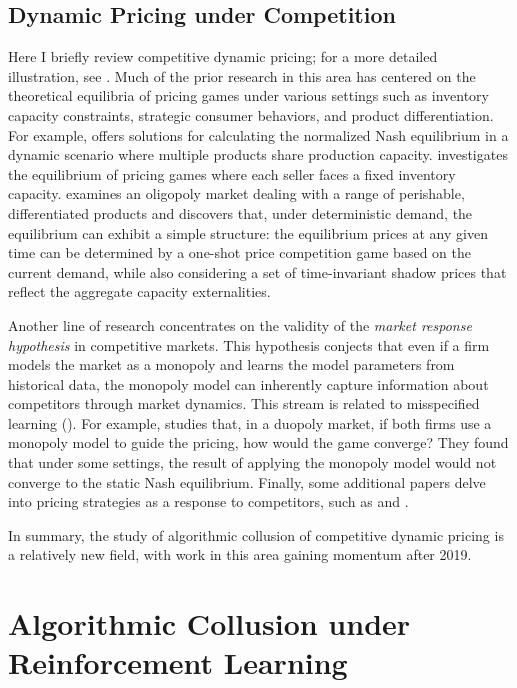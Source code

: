 \documentclass[mnsc,nonblindrev]{workingpaper}
\begin{document}
\subsection{Dynamic Pricing under Competition}
\label{subsec:competition}

Here I briefly review competitive dynamic pricing; for a more detailed illustration, see \cite{chen2015recent}. Much of the prior research in this area has centered on the theoretical equilibria of pricing games under various settings such as inventory capacity constraints, strategic consumer behaviors, and product differentiation. For example, \cite{adida2010dynamic} offers solutions for calculating the normalized Nash equilibrium in a dynamic scenario where multiple products share production capacity. \cite{martinez2011dynamic} investigates the equilibrium of pricing games where each seller faces a fixed inventory capacity. \cite{gallego2014dynamic} examines an oligopoly market dealing with a range of perishable, differentiated products and discovers that, under deterministic demand, the equilibrium can exhibit a simple structure: the equilibrium prices at any given time can be determined by a one-shot price competition game based on the current demand, while also considering a set of time-invariant shadow prices that reflect the aggregate capacity externalities.

Another line of research concentrates on the validity of the \textit{market response hypothesis} in competitive markets. This hypothesis conjects that even if a firm models the market as a monopoly and learns the model parameters from historical data, the monopoly model can inherently capture information about competitors through market dynamics. This stream is related to misspecified learning (\cite{besbes2015surprising}). For example, \cite{cooper2015learning} studies that, in a duopoly market, if both firms use a monopoly model to guide the pricing, how would the game converge? They found that under some settings, the result of applying the monopoly model would not converge to the static Nash equilibrium. Finally, some additional papers delve into pricing strategies as a response to competitors, such as \cite{fisher2018competition} and \cite{schlosser2018dynamic}.

In summary, the study of algorithmic collusion of competitive dynamic pricing is a relatively new field, with work in this area gaining momentum after 2019.

\section{Algorithmic Collusion under Reinforcement Learning}
\label{sec:acrl}
\end{document}
